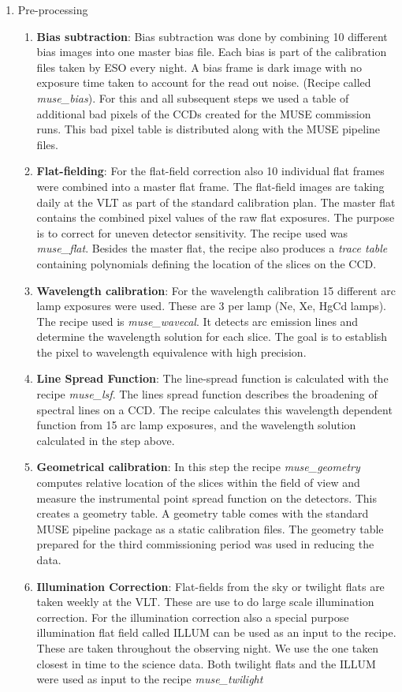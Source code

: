 \begin{enumerate}
        \item Pre-processing
                \begin{enumerate}[I]
			\item \textbf{Bias subtraction}: Bias subtraction was done by combining 10 different bias images into one master bias file. Each bias is part of the calibration files taken by ESO every night. A bias frame is dark image with no exposure time taken to account for the read out noise. (Recipe called \emph{muse\_bias}). For this and all subsequent steps we used a table of additional bad pixels of the CCDs created for the MUSE commission runs. This bad pixel table is distributed along with the MUSE pipeline files. 
			\item \textbf{Flat-fielding}: For the flat-field correction also 10 individual flat frames were combined into a master flat frame. The flat-field images are taking daily at the VLT as part of the standard calibration plan.  The master flat  contains  the  combined  pixel  values  of  the  raw  flat exposures. The purpose is to correct for uneven detector sensitivity. The recipe used was \emph{muse\_flat}. Besides the master flat, the recipe also produces a \emph{trace table} containing polynomials defining the location of the slices on the CCD. 
			\item \textbf{Wavelength calibration}: For the wavelength calibration 15 different arc lamp exposures were used. These are 3 per lamp (Ne, Xe, HgCd lamps). The recipe used is \emph{muse\_wavecal}. It detects arc emission lines and determine the wavelength solution for each slice. The goal is to establish the pixel to wavelength equivalence with high precision.
			\item \textbf{Line Spread Function}: The line-spread function is calculated with the recipe \emph{muse\_lsf}. The lines spread function describes the broadening of spectral lines on a CCD. The recipe calculates this  wavelength dependent function from 15 arc lamp exposures, and the wavelength solution calculated in the step above.  
			\item \textbf{Geometrical calibration}: In this step the recipe \emph{muse\_geometry} computes  relative  location  of the slices within the field of view and measure the instrumental point spread function on the detectors. This creates a geometry table. A geometry table comes with the standard MUSE pipeline package as a static calibration files. The geometry table prepared for the third commissioning period was used in reducing the data. 
			\item \textbf{Illumination Correction}: Flat-fields from the sky or twilight flats are taken weekly at the VLT. These are use to do large scale illumination correction. For the illumination correction also a special purpose  illumination flat field called ILLUM can be used as an input to the recipe. These are taken throughout the observing night. We use the one taken closest in time to the science data. Both twilight flats and the ILLUM were used as input to the recipe \emph{muse\_twilight}
    

\end{enumerate}
\end{enumerate}
